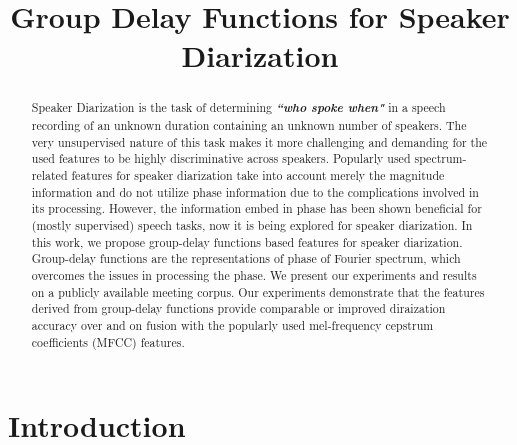 \documentclass[conference]{IEEEtran}
\begin{document}
\title{Group Delay Functions for Speaker Diarization}

\author{
}

\maketitle


\begin{abstract}

Speaker Diarization is the task of determining {\bf\textit{``who spoke when"}} in a speech recording of an unknown duration containing an unknown number of speakers. The very unsupervised nature of this task makes it more challenging and demanding for the used features to be highly discriminative across speakers. Popularly used spectrum-related features for speaker diarization take into account merely the magnitude information and do not utilize phase information due to the complications involved in its processing. However, the information embed in phase has been shown beneficial for (mostly supervised) speech tasks, now it is being explored for speaker diarization. In this work, we propose group-delay functions based features for speaker diarization. Group-delay functions are the representations of phase of Fourier spectrum, which overcomes the issues in processing the phase. We present our experiments and results on a publicly available meeting corpus. Our experiments demonstrate that the features derived from group-delay functions provide comparable or improved diraization accuracy over and on fusion with the popularly used mel-frequency cepstrum coefficients (MFCC) features. \\

\end{abstract}
\IEEEpeerreviewmaketitle



\section{Introduction}
\label{intro}
\end{document}
